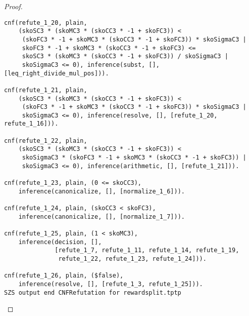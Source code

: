 \begin{proof}
\begin{verbatim}
cnf(refute_1_20, plain,
    (skoSC3 * (skoMC3 * (skoCC3 * -1 + skoFC3)) <
     (skoFC3 * -1 + skoMC3 * (skoCC3 * -1 + skoFC3)) * skoSigmaC3 |
     skoFC3 * -1 + skoMC3 * (skoCC3 * -1 + skoFC3) <=
     skoSC3 * (skoMC3 * (skoCC3 * -1 + skoFC3)) / skoSigmaC3 |
     skoSigmaC3 <= 0), inference(subst, [], [leq_right_divide_mul_pos])).

cnf(refute_1_21, plain,
    (skoSC3 * (skoMC3 * (skoCC3 * -1 + skoFC3)) <
     (skoFC3 * -1 + skoMC3 * (skoCC3 * -1 + skoFC3)) * skoSigmaC3 |
     skoSigmaC3 <= 0), inference(resolve, [], [refute_1_20, refute_1_16])).

cnf(refute_1_22, plain,
    (skoSC3 * (skoMC3 * (skoCC3 * -1 + skoFC3)) <
     skoSigmaC3 * (skoFC3 * -1 + skoMC3 * (skoCC3 * -1 + skoFC3)) |
     skoSigmaC3 <= 0), inference(arithmetic, [], [refute_1_21])).

cnf(refute_1_23, plain, (0 <= skoCC3),
    inference(canonicalize, [], [normalize_1_6])).

cnf(refute_1_24, plain, (skoCC3 < skoFC3),
    inference(canonicalize, [], [normalize_1_7])).

cnf(refute_1_25, plain, (1 < skoMC3),
    inference(decision, [],
              [refute_1_7, refute_1_11, refute_1_14, refute_1_19,
               refute_1_22, refute_1_23, refute_1_24])).

cnf(refute_1_26, plain, ($false),
    inference(resolve, [], [refute_1_3, refute_1_25])).
SZS output end CNFRefutation for rewardsplit.tptp
\end{verbatim}
  \fi
\end{proof}


